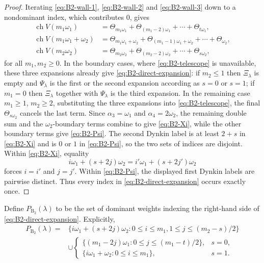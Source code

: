 \documentclass[11pt]{article}
\theoremstyle{definition}
\theoremstyle{remark}
\newcommand{\chr}{\operatorname{ch}}
\newcommand{\typeB}{\ensuremath{\mathrm{B}}}
\begin{document}
\begin{proof}
Iterating \eqref{eq:B2-wall-1}, \eqref{eq:B2-wall-2} and
\eqref{eq:B2-wall-3} down to a nondominant index, which contributes $0$, gives
\begin{align*}
 \chr V(m_1\omega_1)
   &=\Theta_{m_1\omega_1}+\Theta_{(m_1-2)\omega_1}+\cdots+
      \Theta_{t\omega_1},\\
 \chr V(m_1\omega_1+\omega_2)
   &=\Theta_{m_1\omega_1+\omega_2}+\Theta_{(m_1-1)\omega_1+\omega_2}
       +\cdots+\Theta_{\omega_2},\\
 \chr V(m_2\omega_2)
   &=\Theta_{m_2\omega_2}+\Theta_{(m_2-2)\omega_2}+\cdots+
      \Theta_{s\omega_2},
\end{align*}
for all $m_1,m_2\ge0$.  In the boundary cases, where
\eqref{eq:B2-telescope} is unavailable, these three expansions already give
\eqref{eq:B2-direct-expansion}: if $m_2\le1$ then $\Xi_\lambda$ is empty and
$\Psi_\lambda$ is the first or the second expansion according as $s=0$ or
$s=1$; if $m_1=0$ then $\Xi_\lambda$ together with $\Psi_\lambda$ is the third
expansion.  In the remaining case $m_1\ge1$, $m_2\ge2$, substituting the three
expansions into \eqref{eq:B2-telescope}, the final
$\Theta_{s\omega_2}$ cancels the last term.  Since
$\alpha_3=\omega_1$ and $\alpha_4=2\omega_2$, the remaining double sum and the
$\omega_2$-boundary terms combine to give \eqref{eq:B2-Xi}, while the other
boundary terms give \eqref{eq:B2-Psi}.  The second Dynkin label is
at least $2+s$ in \eqref{eq:B2-Xi} and is $0$ or $1$ in
\eqref{eq:B2-Psi}, so the two sets of indices are disjoint.  Within
\eqref{eq:B2-Xi}, equality
\[
 i\omega_1+(s+2j)\omega_2=i'\omega_1+(s+2j')\omega_2
\]
forces $i=i'$ and $j=j'$.  Within \eqref{eq:B2-Psi}, the displayed first
Dynkin labels are pairwise distinct.  Thus every index in
\eqref{eq:B2-direct-expansion} occurs exactly once.
\end{proof}

Define $P_{\typeB_2}(\lambda)$ to be the set of dominant weights indexing the
right-hand side of \eqref{eq:B2-direct-expansion}.  Explicitly,
\begin{align*}
P_{\typeB_2}(\lambda)={}&
 \{i\omega_1+(s+2j)\omega_2:0\le i\le m_1,
            1\le j\le(m_2-s)/2\}\\
&\cup
\begin{cases}
 \{(m_1-2j)\omega_1:0\le j\le(m_1-t)/2\},&s=0,\\
 \{i\omega_1+\omega_2:0\le i\le m_1\},&s=1.
\end{cases}
\end{align*}
\end{document}
